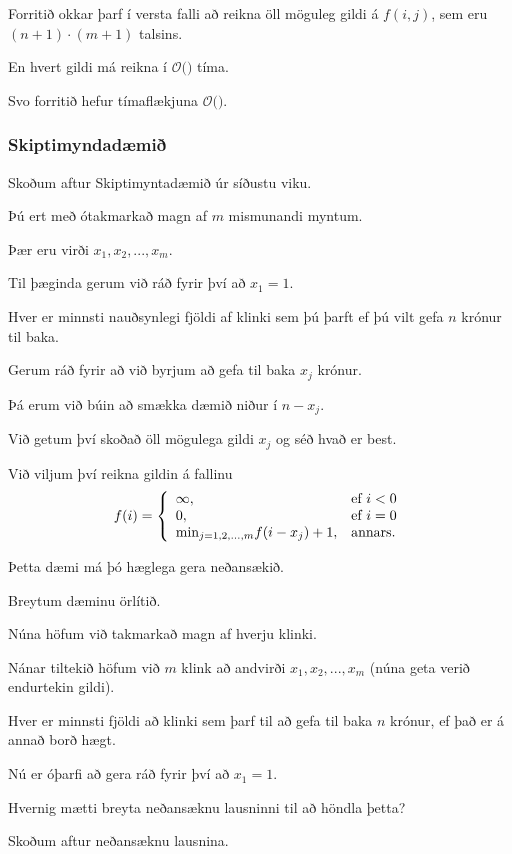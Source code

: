 {
	{
		\item<1-> Forritið okkar þarf í versta falli að reikna öll möguleg gildi á $f(i, j)$, sem eru $(n + 1) \cdot (m + 1)$ talsins.
		\item<2-> En hvert gildi má reikna í $\mathcal{O}($$)$ tíma.
		\item<4-> Svo forritið hefur tímaflækjuna $\mathcal{O}($\onslide<5->{$n \cdot m$}$)$.
	}
}

{
	\frametitle{Skiptimyndadæmið}
	{
		\item<1-> Skoðum aftur Skiptimyntadæmið úr síðustu viku.
		\item<2-> Þú ert með ótakmarkað magn af $m$ mismunandi myntum.
		\item<3-> Þær eru virði $x_1, x_2, ..., x_m$.
		\item<4-> Til þæginda gerum við ráð fyrir því að $x_1 = 1$.
		\item<5-> Hver er minnsti nauðsynlegi fjöldi af klinki sem þú þarft ef þú vilt gefa $n$ krónur til baka.
	}
}

{
	{
		\item<1-> Gerum ráð fyrir að við byrjum að gefa til baka $x_j$ krónur.
		\item<2-> Þá erum við búin að smækka dæmið niður í $n - x_j$.
		\item<3-> Við getum því skoðað öll mögulega gildi $x_j$ og séð hvað er best.
		\item<4-> Við viljum því reikna gildin á fallinu
		\[
			f(i) = 
			\left \{
			\env{array}
			{
				{l l}
				\infty, & \text{ef $i < 0$}\\
				0, & \text{ef $i = 0$}\\
				\text{min}_{j = 1, 2, ..., m} f(i - x_j) + 1, & \text{annars}.
			}
			\right .
		\]
	}
}

{
}

{
	{
		\item<1-> Þetta dæmi má þó hæglega gera neðansækið.
	}
}

{
}

{
	{
		\item<1-> Breytum dæminu örlítið.
		\item<2-> Núna höfum við takmarkað magn af hverju klinki.
		\item<3-> Nánar tiltekið höfum við $m$ klink að andvirði $x_1, x_2, ..., x_m$ (núna geta verið endurtekin gildi).
		\item<4-> Hver er minnsti fjöldi að klinki sem þarf til að gefa til baka $n$ krónur, ef það er á annað borð hægt.
		\item<5-> Nú er óþarfi að gera ráð fyrir því að $x_1 = 1$.
		\item<6-> Hvernig mætti breyta neðansæknu lausninni til að höndla þetta?
		\item<7-> Skoðum aftur neðansæknu lausnina.
	}
}

